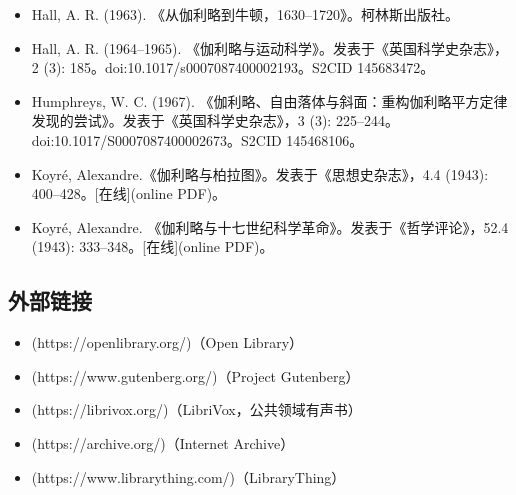 \begin{itemize}
\item Hall, A. R. (1963). 《从伽利略到牛顿，1630–1720》。柯林斯出版社。  
\item Hall, A. R. (1964–1965). 《伽利略与运动科学》。发表于《英国科学史杂志》，2 (3): 185。doi:10.1017/s0007087400002193。S2CID 145683472。  
\item Humphreys, W. C. (1967). 《伽利略、自由落体与斜面：重构伽利略平方定律发现的尝试》。发表于《英国科学史杂志》，3 (3): 225–244。doi:10.1017/S0007087400002673。S2CID 145468106。  
\item Koyré, Alexandre.《伽利略与柏拉图》。发表于《思想史杂志》，4.4 (1943): 400–428。[在线](online PDF)。  
\item Koyré, Alexandre. 《伽利略与十七世纪科学革命》。发表于《哲学评论》，52.4 (1943): 333–348。[在线](online PDF)。  
\end{itemize}
\subsection{外部链接}
\begin{itemize}
\item [伽利略·伽利莱的作品](https://openlibrary.org/)（Open Library）
\item [伽利略·伽利莱的作品](https://www.gutenberg.org/)（Project Gutenberg）
\item [伽利略·伽利莱的作品](https://librivox.org/)（LibriVox，公共领域有声书）
\item [关于伽利略·伽利莱的作品](https://archive.org/)（Internet Archive）
\item [伽利略个人图书馆中的作品](https://www.librarything.com/)（LibraryThing）
\end{itemize}